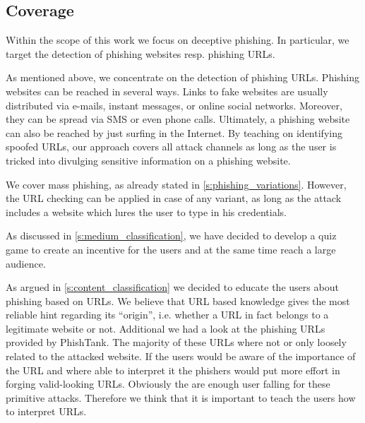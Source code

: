\subsection{Coverage}
\label{s:coverage}
\begin{description}[leftmargin=0cm]
	\item[Deceptive Phishing as Phishing Technique] Within the scope of this work we focus on deceptive phishing.
 In particular, we target the detection of phishing websites resp. phishing URLs.
	\item[Several Attack Channels] As mentioned above, we concentrate on the detection of phishing URLs.
 Phishing websites can be reached in several ways.
 Links to fake websites are usually distributed via e-mails, instant messages, or online social networks.
 Moreover, they can be spread via SMS or even phone calls.
 Ultimately, a phishing website can also be reached by just surfing in the Internet.
 By teaching on identifying spoofed URLs, our approach covers all attack channels as long as the user is tricked into divulging sensitive information on a phishing website.

	\item[Mass Phishing as Variation of Phishing] We cover mass phishing, as already stated in \autoref{s:phishing_variations}.
 However, the URL checking can be applied in case of any variant, as long as the attack includes a website which lures the user to type in his credentials.

	\item[Game and Quiz Based Learning as Communication Medium] As discussed in \autoref{s:medium_classification}, we have decided to develop a quiz game to create an incentive for the users and at the same time reach a large audience. 

	\item[URL Based Knowledge as Learning Content] As argued in \autoref{s:content_classification} we decided to educate the users about phishing based on URLs. 
We believe that URL based knowledge gives the most reliable hint regarding its ``origin'', i.e. whether a URL in fact belongs to a legitimate website or not.
Additional we had a look at the phishing URLs provided by PhishTank. The majority of these URLs where not or only loosely related to the attacked website. If the users would be aware of the importance of the URL and where able to interpret it the phishers would put more effort in forging valid-looking URLs. Obviously the are enough user falling for these primitive attacks. Therefore we think that it is important to teach the users how to interpret URLs.


\end{description}
